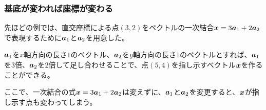 \documentclass[../../imaging-math]{subfiles}
\begin{document}
\subsubsection{基底が変われば座標が変わる}

先ほどの例では、直交座標による点$(3,2)$をベクトルの一次結合$\vb*{x} = 3 \vb*{a}_1 + 2 \vb*{a}_2$で表現するために$\vb*{a}_1$と$\vb*{a}_2$を用意した。

$\vb*{a}_1$を$x$軸方向の長さ$1$のベクトル、$\vb*{a}_2$を$y$軸方向の長さ$1$のベクトルとすれば、$\vb*{a}_1$を$3$倍、$\vb*{a}_2$を$2$倍して足し合わせることで、点$(5,4)$を指し示すベクトル$\vb*{x}$を作ることができる。

\br

ここで、一次結合の式$\vb*{x} = 3 \vb*{a}_1 + 2 \vb*{a}_2$は変えずに、$\vb*{a}_1$と$\vb*{a}_2$を変更すると、$\vb*{x}$が指し示す点も変わってしまう。
\end{document}

